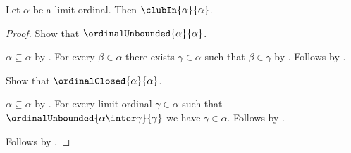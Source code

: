 \begin{proposition}\label{limit_ordinal_is_club_in_itself}
    Let $\alpha$ be a limit ordinal.
    Then $\clubIn{\alpha}{\alpha}$.
\end{proposition}
\begin{proof}
    Show that $\ordinalUnbounded{\alpha}{\alpha}$.
    \begin{subproof}
        $\alpha\subseteq\alpha$ by .
        For every $\beta\in\alpha$ there exists $\gamma\in\alpha$ such that
            $\beta\in\gamma$ by .
        Follows by .
    \end{subproof}
    Show that $\ordinalClosed{\alpha}{\alpha}$.
    \begin{subproof}
        $\alpha\subseteq\alpha$ by .
        For every limit ordinal $\gamma\in\alpha$ such that
            $\ordinalUnbounded{\alpha\inter\gamma}{\gamma}$
            we have $\gamma\in\alpha$.
        Follows by .
    \end{subproof}
    Follows by .
\end{proof}


